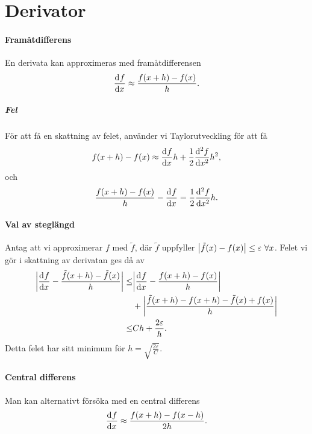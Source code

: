 \section{Derivator}

\paragraph{Framåtdifferens}
En derivata kan approximeras med framåtdifferensen
\begin{align*}
	\dv[]{f}{x} (x) \approx \frac{f(x + h) - f(x)}{h}.
\end{align*}

\subparagraph{Fel}
För att få en skattning av felet, använder vi Taylorutveckling för att få
\begin{align*}
	f(x + h) - f(x) \approx \dv[]{f}{x} (x)h + \frac{1}{2}\dv[2]{f}{x} (c)h^{2},
\end{align*}
och
\begin{align*}
	\frac{f(x + h) - f(x)}{h} - \dv[]{f}{x} (x) = \frac{1}{2}\dv[2]{f}{x} (c)h.
\end{align*}

\paragraph{Val av steglängd}
Antag att vi approximerar $f$ med $\tilde{f}$, där $\tilde{f}$ uppfyller $\abs{\tilde{f}(x) - f(x)} \leq \varepsilon\ \forall x$. Felet vi gör i skattning av derivatan ges då av
\begin{align*}
	\abs{\dv[]{f}{x} (x) - \frac{\tilde{f}(x + h) - \tilde{f}(x)}{h}} \leq& \abs{\dv[]{f}{x} (x) - \frac{f(x + h) - f(x)}{h}} \\
	                                                                      &+ \abs{\frac{\tilde{f}(x + h) - f(x + h) - \tilde{f}(x) + f(x)}{h}} \\
	                                                                  \leq& Ch + \frac{2\varepsilon}{h}.
\end{align*}
Detta felet har sitt minimum för $h = \sqrt{\frac{2\varepsilon}{C}}$.

\paragraph{Central differens}
Man kan alternativt försöka med en central differens
\begin{align*}
	\dv[]{f}{x} (x) \approx \frac{f(x + h) - f(x - h)}{2h}.
\end{align*}

